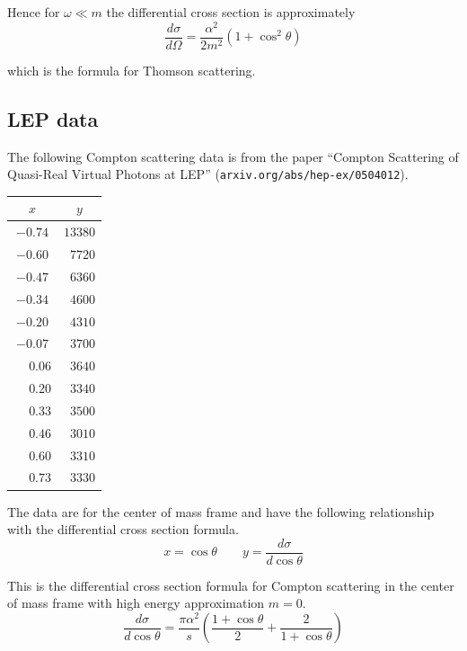 \documentclass[12pt]{article}
\begin{document}
\noindent
Hence for $\omega\ll m$ the differential cross section is approximately
\begin{equation*}
\frac{d\sigma}{d\Omega}=\frac{\alpha^2}{2m^2}(1+\cos^2\theta)
\end{equation*}

\noindent
which is the formula for Thomson scattering.

\subsection*{LEP data}
The following Compton scattering data is from the paper
``Compton Scattering of Quasi-Real Virtual Photons at LEP''
(\verb$arxiv.org/abs/hep-ex/0504012$).

\begin{center}
\begin{tabular}{|c|c|}
\hline
$x$ & $y$\\
\hline
$-0.74$ & $13380$\\
$-0.60$ & $\phantom{0}7720$\\
$-0.47$ & $\phantom{0}6360$\\
$-0.34$ & $\phantom{0}4600$\\
$-0.20$ & $\phantom{0}4310$\\
$-0.07$ & $\phantom{0}3700$\\
$\phantom{+}0.06$ & $\phantom{0}3640$\\
$\phantom{+}0.20$ & $\phantom{0}3340$\\
$\phantom{+}0.33$ & $\phantom{0}3500$\\
$\phantom{+}0.46$ & $\phantom{0}3010$\\
$\phantom{+}0.60$ & $\phantom{0}3310$\\
$\phantom{+}0.73$ & $\phantom{0}3330$\\
\hline
\end{tabular}
\end{center}

\noindent
The data are for the center of mass frame and have the following relationship with the differential cross section formula.
\begin{equation*}
x=\cos\theta\qquad y=\frac{d\sigma}{d\cos\theta}
\end{equation*}

\noindent
This is the differential cross section formula for Compton scattering
in the center of mass frame with high energy approximation $m=0$.
\begin{equation*}
\frac{d\sigma}{d\cos\theta}
=\frac{\pi\alpha^2}{s}\left(
\frac{1+\cos\theta}{2}+\frac{2}{1+\cos\theta}
\right)
\end{equation*}
\end{document}
